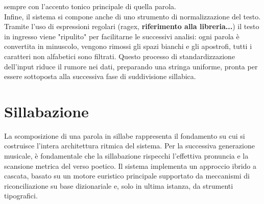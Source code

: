 sempre con l'accento tonico principale di quella parola.\\
Infine, il sistema si compone anche di uno strumento di normalizzazione del testo. Tramite l'uso di espressioni regolari (ragex, \textbf{riferimento alla libreria...}) 
il testo in ingresso viene "ripulito" per facilitarne le successivi analisi: ogni parola è convertita in minuscolo, vengono rimossi gli spazi bianchi e 
gli apostrofi, tutti i caratteri non alfabetici sono filtrati. Questo processo di standardizzazione dell'input riduce il rumore nei dati, preparando una 
stringa uniforme, pronta per essere sottoposta alla successiva fase di suddivisione sillabica.

\section{Sillabazione}
La scomposizione di una parola in sillabe rappresenta il fondamento su cui si costruisce l'intera architettura ritmica del sistema. 
Per la successiva generazione musicale, è fondamentale che la sillabazione rispecchi l'effettiva pronuncia e la scansione metrica del verso poetico. 
Il sistema implementa un approccio ibrido a cascata, basato su un motore euristico principale supportato da meccanismi di riconciliazione su base 
dizionariale e, solo in ultima istanza, da strumenti tipografici.

